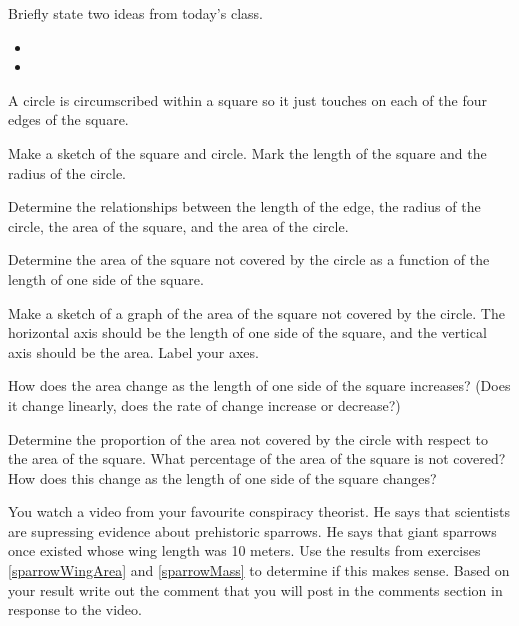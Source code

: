 \begin{problem}
\item Briefly state two ideas from today's class.
  \begin{itemize}
  \item
  \item
  \end{itemize}
\item A circle is circumscribed within a square so it just touches on
  each of the four edges of the square.
  \begin{subproblem}
    \item Make a sketch of the square and circle. Mark the length of
      the square and the radius of the circle.
    \item Determine the relationships between the length of the edge,
      the radius of the circle, the area of the square, and the area
      of the circle.
    \item Determine the area of the square not covered by the circle
      as a function of the length of one side of the square.
    \item Make a sketch of a graph of the area of the square not
      covered by the circle. The horizontal axis should be the length
      of one side of the square, and the vertical axis should be the
      area. Label your axes.
    \item How does the area change as the length of one side of the
      square increases? (Does it change linearly, does the rate of
      change increase or decrease?)
    \item Determine the proportion of the area not covered by the
      circle with respect to the area of the square. What percentage
      of the area of the square is not covered? How does this change
      as the length of one side of the square changes?
  \end{subproblem}
  \item You watch a video from your favourite conspiracy theorist.
    He says that scientists are supressing evidence about prehistoric sparrows.
    He says that giant sparrows once existed whose wing length was 10 meters.
    Use the results from exercises  \ref{sparrowWingArea} and \ref{sparrowMass} to determine if this makes sense.
    Based on your result write out the comment that you will post in the comments
    section in response to the video.

\end{problem}



